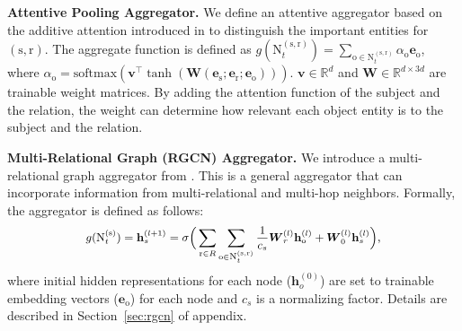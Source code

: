 \documentclass[11pt,a4paper]{article}
\newcommand{\wj}[1]{\textcolor{red}{[WJ: #1]}}
\newcommand{\bv}{\mathbf{v}}
\newcommand{\bbh}{\mathbf{h}}
\newcommand{\bW}{\boldsymbol{W}}
\newcommand{\para}[1]{\smallskip\noindent\textbf{#1}}
\newcommand{\teN}{\text{N}}
\newcommand{\bs}{\mathrm{s}}
\newcommand{\br}{\mathrm{r}}
\newcommand{\bo}{\mathrm{o}}
\newcommand{\es}{\boldsymbol{e}_{\mathrm{s}}}
\newcommand{\er}{\boldsymbol{e}_{\mathrm{r}}}
\newcommand{\eo}{\boldsymbol{e}_{\mathrm{o}}}
\begin{document}
\para{Attentive Pooling Aggregator.}
We define an attentive aggregator based on the additive attention introduced in \citep{Bahdanau2015NeuralMT} to distinguish the important entities for $(\bs,\br)$. 
The aggregate function is defined as {\small $g(\teN_t^{(\bs,\br)}) = \sum_{\bo \in \teN_t^{(\bs, \br)}} \alpha_\bo \eo$},
where {\small $\alpha_\bo = \textrm{softmax}(\bv^\top \tanh(\bW(\es; \er; \eo)))$}.
{\small  $\bv \in \mathbb{R}^d$} and  {\small $\bW \in \mathbb{R}^{d \times 3d}$} are trainable weight matrices. 
By adding the attention function of the subject and the relation, the weight can determine how relevant each object entity is to the subject and the relation.


\para{Multi-Relational Graph (RGCN) Aggregator.} 
We introduce a multi-relational graph aggregator from \citep{Schlichtkrull2018ModelingRD}. 
This is a general aggregator that can incorporate information from multi-relational and multi-hop neighbors. Formally, the aggregator is defined as follows:
\begin{equation}
\label{eq:rgcn}
    \small g(\teN^{(\bs)}_t)= \bbh_s^{(l+1)} = \sigma\Big(\sum_{\br\in R}\sum_{\bo \in \teN_t^{(\bs,\br)}} \frac{1}{c_s} \bW_r^{(l)} \bbh_\bo^{(l)} + \bW_0^{(l)} \bbh_s^{(l)}\Big), 
\end{equation}
where initial hidden representations for each node ($\bbh_o^{(0)}$) are set to trainable embedding vectors ($\eo$) for each node and $c_s$ is a normalizing factor.
Details are described in Section~\ref{sec:rgcn} of appendix.

\end{document}
